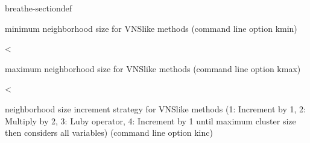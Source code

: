 \documentclass[letterpaper,10pt,openany,oneside,english]{sphinxmanual}
\begin{document}
\begin{fulllineitems}
\begin{sphinxuseclass}{breathe-sectiondef}
\begin{fulllineitems}
\sphinxAtStartPar
minimum neighborhood size for VNS\sphinxhyphen{}like methods (command line option \sphinxhyphen{}kmin) 

\end{fulllineitems}


\begin{fulllineitems}
\label{\detokenize{ref/ref_cpp:_CPPv4N8ToulBar27vnsKincE}}\label{\detokenize{ref/ref_cpp:_CPPv3N8ToulBar27vnsKincE}}\label{\detokenize{ref/ref_cpp:_CPPv2N8ToulBar27vnsKincE}}\label{\detokenize{ref/ref_cpp:ToulBar2::vnsKinc__VNSInc}}
\pysigstartsignatures
\pysigstartmultiline
{}
\pysigstopmultiline
\pysigstopsignatures
\sphinxAtStartPar
\textless{} 

\sphinxAtStartPar
maximum neighborhood size for VNS\sphinxhyphen{}like methods (command line option \sphinxhyphen{}kmax) 

\end{fulllineitems}


\begin{fulllineitems}
\label{\detokenize{ref/ref_cpp:_CPPv4N8ToulBar29vnsLDScurE}}\label{\detokenize{ref/ref_cpp:_CPPv3N8ToulBar29vnsLDScurE}}\label{\detokenize{ref/ref_cpp:_CPPv2N8ToulBar29vnsLDScurE}}\label{\detokenize{ref/ref_cpp:ToulBar2::vnsLDScur__i}}
\pysigstartsignatures
\pysigstartmultiline
{}
\pysigstopmultiline
\pysigstopsignatures
\sphinxAtStartPar
\textless{} 

\sphinxAtStartPar
neighborhood size increment strategy for VNS\sphinxhyphen{}like methods (1: Increment by 1, 2: Multiply by 2, 3: Luby operator, 4: Increment by 1 until maximum cluster size then considers all variables) (command line option \sphinxhyphen{}kinc) 

\end{fulllineitems}


\end{sphinxuseclass}
\end{fulllineitems}
\end{document}

